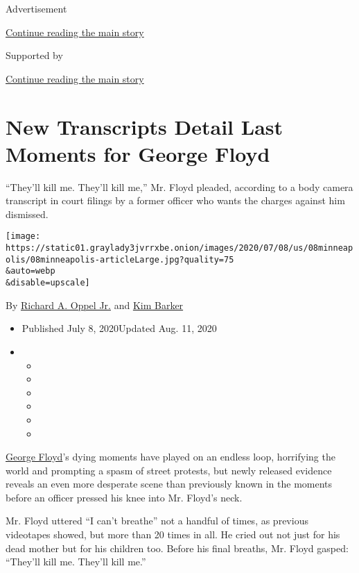 Advertisement

\protect\hyperlink{after-top}{Continue reading the main story}

Supported by

\protect\hyperlink{after-sponsor}{Continue reading the main story}

\hypertarget{new-transcripts-detail-last-moments-for-george-floyd}{%
\section{New Transcripts Detail Last Moments for George
Floyd}\label{new-transcripts-detail-last-moments-for-george-floyd}}

``They'll kill me. They'll kill me,'' Mr. Floyd pleaded, according to a
body camera transcript in court filings by a former officer who wants
the charges against him dismissed.

\texttt{[image: https://static01.graylady3jvrrxbe.onion/images/2020/07/08/us/08minneapolis/08minneapolis-articleLarge.jpg?quality=75\\\&auto=webp\\\&disable=upscale]}

By
\href{https://www.nytimes3xbfgragh.onion/by/richard-a-oppel-jr}{Richard
A. Oppel Jr.} and
\href{https://www.nytimes3xbfgragh.onion/by/kim-barker}{Kim Barker}

\begin{itemize}
\item
  Published July 8, 2020Updated Aug. 11, 2020
\item
  \begin{itemize}
  \item
  \item
  \item
  \item
  \item
  \item
  \end{itemize}
\end{itemize}

\href{https://www.nytimes3xbfgragh.onion/2020/08/11/us/george-floyd-body-cam-full-video.html}{George
Floyd}'s dying moments have played on an endless loop, horrifying the
world and prompting a spasm of street protests, but newly released
evidence reveals an even more desperate scene than previously known in
the moments before an officer pressed his knee into Mr. Floyd's neck.

Mr. Floyd uttered ``I can't breathe'' not a handful of times, as
previous videotapes showed, but more than 20 times in all. He cried out
not just for his dead mother but for his children too. Before his final
breaths, Mr. Floyd gasped: ``They'll kill me. They'll kill me.''

